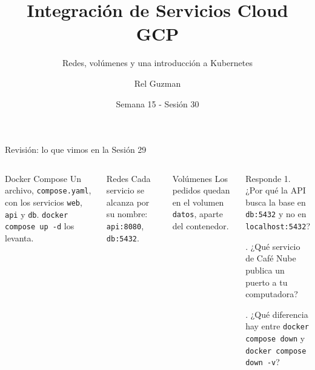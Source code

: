 \documentclass[aspectratio=169,10pt,c]{beamer}
\title{Integración de Servicios Cloud GCP}
\subtitle{Redes, volúmenes y una introducción a Kubernetes}
\date{Semana 15 - Sesión 30}
\author{Rel Guzman}
\begin{document}
{\maketitle}

\begin{frame}{Revisión: lo que vimos en la Sesión 29}
\begin{columns}[T,onlytextwidth]
\begin{block}{Docker Compose}
\small Un archivo, \texttt{compose.yaml}, con los servicios \texttt{web}, \texttt{api} y \texttt{db}. \texttt{docker compose up -d} los levanta.
\end{block}
\begin{block}{Redes}
\small Cada servicio se alcanza por su nombre: \texttt{api:8080}, \texttt{db:5432}.
\end{block}
\begin{block}{Volúmenes}
\small Los pedidos quedan en el volumen \texttt{datos}, aparte del contenedor.
\end{block}
\begin{alertblock}{Responde}
\small
1. ¿Por qué la API busca la base en \texttt{db:5432} y no en \texttt{localhost:5432}?\par{}. ¿Qué servicio de Café Nube publica un puerto a tu computadora?\par{}. ¿Qué diferencia hay entre \texttt{docker compose down} y \texttt{docker compose down -v}?
\end{alertblock}
\end{columns}
\end{frame}
\end{document}
